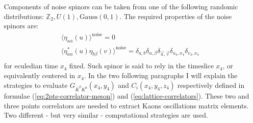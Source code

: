 \documentclass[english, LaM, oneside, noexaminfo]{sapthesis}
\begin{document}
Components of noise spinors can be taken from one of the following randomic distributions: $\mathbb{Z}_2, U(1), \text{Gauss}(0,1)$.
The required properties of the noise spinors are:
\begin{equation}\label{eq:eta-properties}
    \begin{split}
        & \langle \eta_{a\alpha} (u) \rangle^{\text{noise}} = 0 \\
        & \langle \eta^{*}_{a\alpha} (u) \eta_{b\beta} (v) \rangle^{\text{noise}} = \delta_{a,b} \delta_{\alpha,\beta} \delta_{\vec u, \vec v} \delta_{u_4,x_4} \delta_{v_4,x_4} \\
    \end{split}
\end{equation}
for eculedian time $x_4$ fixed.
Such spinor is said to rely in the timeslice $x_4$, or equivalently centered in $x_4$.
\newline
In the two following paragraphs I will explain the strategies to evaluate $G_{\bar K^0 K^0}(x_4,y_4)$ and $C_i(x_4,y_4,z_4)$ respectively defined in formulae (\ref{eq:2pts-correlator-meson}) and (\ref{eq:lattice-correlators}).
These two and three points correlators are needed to extract Kaons oscillations matrix elements.
Two different - but very similar - computational strategies are used.
\end{document}
